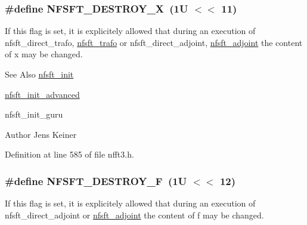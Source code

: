 \hypertarget{group__nfsft_ga6f22df0b292db920d795b3e3569181f2}{
\subsubsection[{N\-F\-S\-F\-T\-\_\-\-D\-E\-S\-T\-R\-O\-Y\-\_\-\-X}]{\setlength{\rightskip}{0pt plus 5cm}\#define N\-F\-S\-F\-T\-\_\-\-D\-E\-S\-T\-R\-O\-Y\-\_\-\-X~(1\-U $<$$<$ 11)}}\label{group__nfsft_ga6f22df0b292db920d795b3e3569181f2}
If this flag is set, it is explicitely allowed that during an execution of nfsft\-\_\-direct\-\_\-trafo, \hyperlink{group__nfsft_ga5796fc68c432d46dfcab7abd8c56ee22}{nfsft\-\_\-trafo} or nfsft\-\_\-direct\-\_\-adjoint, \hyperlink{group__nfsft_ga813bb48d404c7286310733c99a81a169}{nfsft\-\_\-adjoint} the content of {\ttfamily x} may be changed.

\begin{DoxySeeAlso}{See Also}
\hyperlink{group__nfsft_ga65cda3f4a3edc5eb39c697cf34b1f0b9}{nfsft\-\_\-init} 

\hyperlink{group__nfsft_ga2812aa5beba0eb7efd3072bf323a0155}{nfsft\-\_\-init\-\_\-advanced} 

nfsft\-\_\-init\-\_\-guru 
\end{DoxySeeAlso}
\begin{DoxyAuthor}{Author}
Jens Keiner 
\end{DoxyAuthor}


Definition at line 585 of file nfft3.\-h.

\hypertarget{group__nfsft_ga2b32e2eabd33bf0886f6df45365d04c0}{
\subsubsection[{N\-F\-S\-F\-T\-\_\-\-D\-E\-S\-T\-R\-O\-Y\-\_\-\-F}]{\setlength{\rightskip}{0pt plus 5cm}\#define N\-F\-S\-F\-T\-\_\-\-D\-E\-S\-T\-R\-O\-Y\-\_\-\-F~(1\-U $<$$<$ 12)}}\label{group__nfsft_ga2b32e2eabd33bf0886f6df45365d04c0}
If this flag is set, it is explicitely allowed that during an execution of nfsft\-\_\-direct\-\_\-adjoint or \hyperlink{group__nfsft_ga813bb48d404c7286310733c99a81a169}{nfsft\-\_\-adjoint} the content of {\ttfamily f} may be changed.

